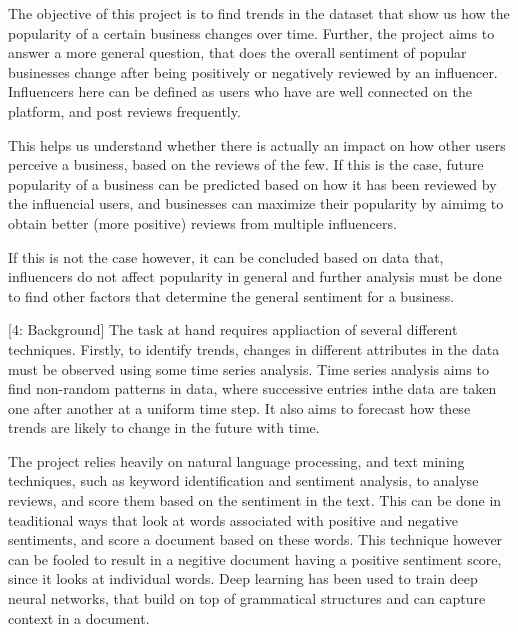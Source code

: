 \begin{homeworkProblem}
The objective of this project is to find trends in the dataset that
show us how the popularity of a certain business changes over
time. Further, the project aims to answer a more general question, that
does the overall sentiment of popular businesses change after being
positively or negatively reviewed by an influencer. Influencers here
can be defined as users who have are well connected on the platform,
and post reviews frequently.


This helps us understand whether there is actually an impact on how
other users perceive a business, based on the reviews of the few. If
this is the case, future popularity of a business can be predicted
based on how it has been reviewed by the influencial users, and
businesses can maximize their popularity by aimimg to obtain better
(more positive) reviews from multiple influencers.


If this is not the case however, it can be concluded based on data
that, influencers do not affect popularity in general and further
analysis must be done to find other factors that determine the general
sentiment for a business.

\end{homeworkProblem}
\clearpage

[4: Background]
The task at hand requires appliaction of several different
techniques. Firstly, to identify trends, changes in different
attributes in the data must be observed using some time series
analysis. Time series analysis aims to find non-random patterns in
data, where successive entries inthe data are taken one after another
at a uniform time step. It also aims to forecast how these trends are
likely to change in the future with time.


The project relies heavily on natural language processing, and text
mining techniques, such as keyword identification and sentiment
analysis, to analyse reviews, and score them based on the sentiment in
the text. This can be done in teaditional ways that look at words
associated with positive and negative sentiments, and score a document
based on these words. This technique however can be fooled to result in
a negitive document having a positive sentiment score, since it looks
at individual words. Deep learning has been used to train deep neural
networks, that build on top of grammatical structures and can capture
context in a document.


